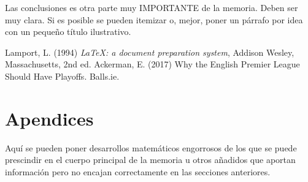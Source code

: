 \documentclass[11pt,a4paper,spanish]{book}
\begin{document}
Las conclusiones es otra parte muy IMPORTANTE de la memoria. Deben ser muy clara. Si es posible se pueden itemizar o, mejor, poner un párrafo por idea con un pequeño título ilustrativo.


\begin{thebibliography}{a}
 Lamport, L. (1994) \emph{\LaTeX: a document preparation system}, Addison
Wesley, Massachusetts, 2nd ed.
 Ackerman, E. (2017) Why the English Premier League Should Have Playoffs.  Balls.ie. 
\end{thebibliography}
% 
%

\appendix
\chapter{Apendices}

Aquí se pueden poner desarrollos matemáticos engorrosos de los que se puede prescindir en el cuerpo principal de la memoria u otros añadidos que aportan información pero no encajan correctamente en las secciones anteriores.
\end{document}
